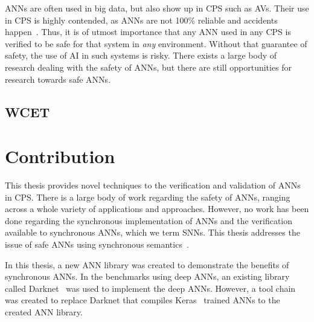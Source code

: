 \acp{ANN} are often used in big data, but also show up in \ac{CPS} such as \acfp{AV}.
Their use in \ac{CPS} is highly contended, as \acp{ANN} are not 100\% reliable and accidents happen~\cite{coldewey_2018}.
Thus, it is of utmost importance that any \ac{ANN} used in any \ac{CPS} is verified to be safe for that system in \textit{any} environment.
Without that guarantee of safety, the use of \ac{AI} in such systems is risky.
There exists a large body of research dealing with the safety of \acp{ANN}, but there are still opportunities for research towards safe \acp{ANN}.

\subsection{\acf{WCET}}

\section{Contribution}
This thesis provides novel techniques to the verification and validation of \acfp{ANN} in \acf{CPS}.
There is a large body of work regarding the safety of \acp{ANN}, ranging across a whole variety of applications and approaches.
However, no work has been done regarding the synchronous implementation of \acp{ANN} and the verification available to synchronous \acp{ANN}, which we term \acfp{SNN}.  
This thesis addresses the issue of safe \acp{ANN} using synchronous semantics~\cite{berry1991}.

In this thesis, a new \ac{ANN} library was created to demonstrate the benefits of synchronous \acp{ANN}.
In the benchmarks using deep \acp{ANN}, an existing library called Darknet~\cite{darknet13} was used to implement the deep \acp{ANN}.
However, a tool chain was created to replace Darknet that compiles Keras~\cite{chollet2015keras} trained \acp{ANN} to the created \ac{ANN} library.

